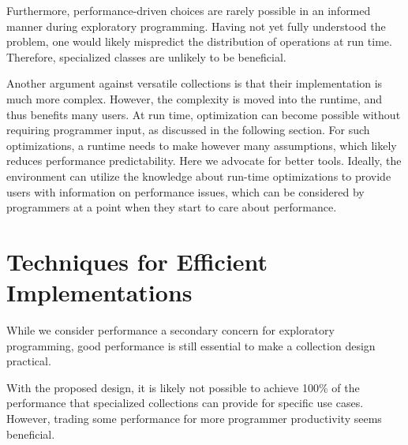 \documentclass[sigconf, 10pt]{acmart}
\begin{document}

Furthermore, performance-driven choices are 
rarely possible in an informed manner during
exploratory programming.
Having not yet fully understood the problem,
one would likely mispredict the distribution of operations at run time.
Therefore, specialized classes are unlikely to be beneficial.

Another argument against versatile collections is
that their implementation is much more complex.
However, the complexity is moved into the runtime,
and thus benefits many users.
At run time, optimization can become possible
without requiring programmer input,
as discussed in the following section.
For such optimizations, a runtime needs to make however many assumptions,
which likely reduces performance predictability.
Here we advocate for better tools.
Ideally, the environment can utilize the knowledge about run-time optimizations
to provide users with information on performance issues,
which can be considered by programmers
at a point when they start to care about performance.



\section{Techniques for Efficient Implementations}
\label{sec:impl-techniques}

While we consider performance a secondary concern for exploratory programming,
good performance is still essential to make a collection design practical.

With the proposed design, it is likely not possible to achieve 100\%
of the performance that specialized collections can provide
for specific use cases.
However, trading some performance for more programmer productivity
seems beneficial.
\end{document}
